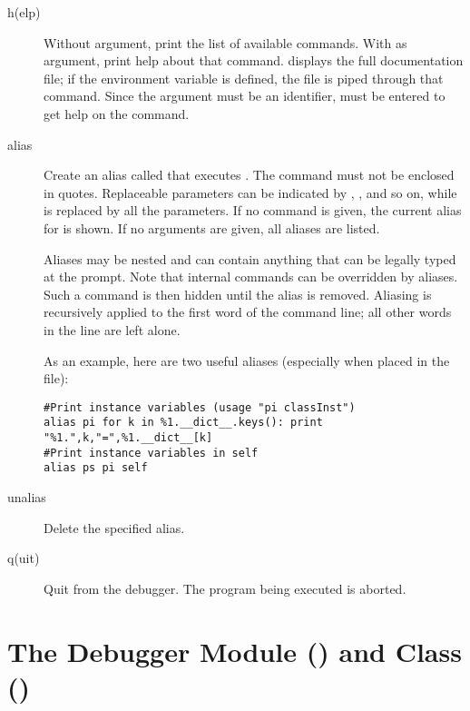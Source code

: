 \begin{description}

\item[h(elp) ]

Without argument, print the list of available commands.  With
 as argument, print help about that command.   displays the full documentation file; if the environment
variable  is defined, the file is piped through that
command.  Since the  argument must be an identifier,
 must be entered to get help on the \samp{!} command.

\item[alias ]\label{command:aliases}

Create an alias called  that executes .  The
command must not be enclosed in quotes.  Replaceable parameters
can be indicated by , , and so on, while \samp{\%*} is
replaced by all the parameters.  If no command is given, the current
alias for  is shown. If no arguments are given, all
aliases are listed.

Aliases may be nested and can contain anything that can be legally
typed at the  prompt.  Note that internal 
commands can be overridden by aliases.  Such a command is then hidden
until the alias is removed.  Aliasing is recursively applied to the
first word of the command line; all other words in the line are left
alone.

As an example, here are two useful aliases (especially when placed
in the  file):

\begin{verbatim}
#Print instance variables (usage "pi classInst")
alias pi for k in %1.__dict__.keys(): print "%1.",k,"=",%1.__dict__[k]
#Print instance variables in self
alias ps pi self
\end{verbatim}
                
\item[unalias ]

Delete the specified alias.

\item[q(uit)]

Quit from the debugger.
The program being executed is aborted.

\end{description}

\section{The Debugger Module () and Class () \label{pydb-module-class}}

